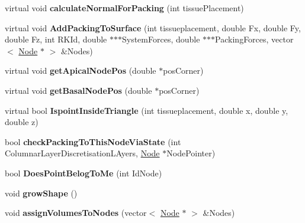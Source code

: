 \begin{DoxyCompactItemize}
\item 
\hypertarget{classShapeBase_ab6611ef2738450d5990e93ccedcb18ad}{}virtual void {\bfseries calculate\+Normal\+For\+Packing} (int tissue\+Placement)\label{classShapeBase_ab6611ef2738450d5990e93ccedcb18ad}

\item 
\hypertarget{classShapeBase_ac754abfd56aff0bb0b6bb1ca0f1c6b7c}{}virtual void {\bfseries Add\+Packing\+To\+Surface} (int tissueplacement, double Fx, double Fy, double Fz, int R\+K\+Id, double $\ast$$\ast$$\ast$System\+Forces, double $\ast$$\ast$$\ast$Packing\+Forces, vector$<$ \hyperlink{classNode}{Node} $\ast$ $>$ \&Nodes)\label{classShapeBase_ac754abfd56aff0bb0b6bb1ca0f1c6b7c}

\item 
\hypertarget{classShapeBase_a8e70b4b3be96de765028face345ad73d}{}virtual void {\bfseries get\+Apical\+Node\+Pos} (double $\ast$pos\+Corner)\label{classShapeBase_a8e70b4b3be96de765028face345ad73d}

\item 
\hypertarget{classShapeBase_a5a6237d792984062e576ecdb87e9c75e}{}virtual void {\bfseries get\+Basal\+Node\+Pos} (double $\ast$pos\+Corner)\label{classShapeBase_a5a6237d792984062e576ecdb87e9c75e}

\item 
\hypertarget{classShapeBase_a0afba3fd829971174cd736b45722758c}{}virtual bool {\bfseries Ispoint\+Inside\+Triangle} (int tissueplacement, double x, double y, double z)\label{classShapeBase_a0afba3fd829971174cd736b45722758c}

\item 
\hypertarget{classShapeBase_a4d7bfb4ed03b7633e02e753a485fbf01}{}bool {\bfseries check\+Packing\+To\+This\+Node\+Via\+State} (int Columnar\+Layer\+Discretisation\+L\+Ayers, \hyperlink{classNode}{Node} $\ast$Node\+Pointer)\label{classShapeBase_a4d7bfb4ed03b7633e02e753a485fbf01}

\item 
\hypertarget{classShapeBase_aed4c893952a6afad718a2037e0635296}{}bool {\bfseries Does\+Point\+Belog\+To\+Me} (int Id\+Node)\label{classShapeBase_aed4c893952a6afad718a2037e0635296}

\item 
\hypertarget{classShapeBase_a92ec10be4c8ba3dd3e4b95ccd08bba7b}{}void {\bfseries grow\+Shape} ()\label{classShapeBase_a92ec10be4c8ba3dd3e4b95ccd08bba7b}

\item 
\hypertarget{classShapeBase_acee26103666067517d905b32edfbf302}{}void {\bfseries assign\+Volumes\+To\+Nodes} (vector$<$ \hyperlink{classNode}{Node} $\ast$ $>$ \&Nodes)\label{classShapeBase_acee26103666067517d905b32edfbf302}


\end{DoxyCompactItemize}
